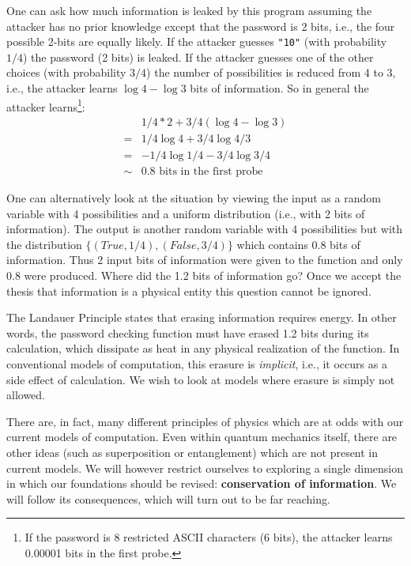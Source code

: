 \documentclass{article}
\begin{document}
One can ask how much information is leaked by this program assuming
the attacker has no prior knowledge except that the password is 2
bits, i.e., the four possible 2-bits are equally likely. If the
attacker guesses \verb|"10"| (with probability $1/4$) the password (2
bits) is leaked. If the attacker guesses one of the other choices
(with probability $3/4$) the number of possibilities is reduced from 4
to 3, i.e., the attacker learns $\log{4} - \log{3}$ bits of
information. So in general the attacker learns\footnote{If the
  password is 8 restricted ASCII characters (6 bits), the attacker
  learns 0.00001 bits in the first probe.}:
\[\begin{array}{ll}
   &  1/4 * 2 + 3/4 (\log{4} - \log{3}) \\
  =&  1/4 \log{4} + 3/4 \log{4/3} \\
  =&  - 1/4 \log{1/4} - 3/4 \log{3/4} \\
  \sim& 0.8 \mbox{~bits~in~the~first~probe}
\end{array}\]

One can alternatively look at the situation by viewing the input as a
random variable with 4 possibilities and a uniform distribution (i.e.,
with 2 bits of information). The output is another random variable
with 4 possibilities but with the distribution
$\{ (True, 1/4), (False, 3/4) \}$ which contains 0.8 bits of
information. Thus 2 input bits of information were given to the
function and only 0.8 were produced. Where did the 1.2 bits of
information go? Once we accept the thesis that information is a
physical entity this question cannot be ignored.

The Landauer Principle states that erasing information requires
energy. In other words, the password checking function must have
erased 1.2 bits during its calculation, which dissipate as heat in any
physical realization of the function. In conventional models of
computation, this erasure is \emph{implicit}, i.e., it occurs as a
side effect of calculation. We wish to look at models where
erasure is simply not allowed.

There are, in fact, many different principles of physics which are at
odds with our current models of computation. Even within quantum
mechanics itself, there are other ideas (such as superposition or
entanglement) which are not present in current models. We will however
restrict ourselves to exploring a single dimension in which our
foundations should be revised: \textbf{conservation of information}.
We will follow its consequences, which will turn out to be far
reaching.
\end{document}

